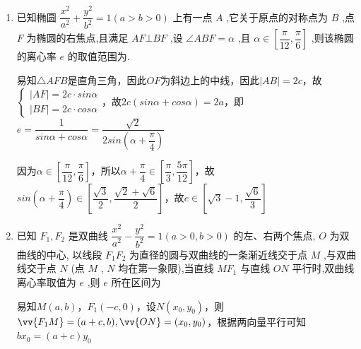 \begin{enumerate}
\begin{jieda}
        由于$y = -t^2+2at-2c^2$开口向下，对称轴为$t = a$，因此应有$\left\{\begin{array}{l}
             a(2a-a)-2c^2 \geq 0 \\
             (a+c)(2a-(a+c)) - 2c^2 \leq 0
        \end{array}\right.$，解得$e = \dfrac{c}{a} \in \left[\dfrac{\sqrt{3}}{3}, \dfrac{\sqrt{2}}{2}\right]$
    \end{jieda}
    \item 已知椭圆 $\dfrac{{x}^{2}}{{a}^{2}} + \dfrac{{y}^{2}}{{b}^{2}} = 1\left( {a > b > 0}\right)$ 上有一点 $A$ ,它关于原点的对称点为 $B$ ,点 $F$ 为椭圆的右焦点,且满足 ${AF} \bot  {BF}$ ,设 $\angle {ABF} = \alpha$ ,且 $\alpha  \in  \left\lbrack  {\dfrac{\pi }{12},\dfrac{\pi }{6}}\right\rbrack$ ,则该椭圆的离心率 $e$ 的取值范围为.
    \begin{jieda}
        易知$\triangle AFB$是直角三角，因此$OF$为斜边上的中线，因此$|AB| = 2c$，故$\left\{\begin{array}{l}
             |AF| = 2c \cdot  sin\alpha  \\
             |BF| = 2c \cdot  cos\alpha 
        \end{array} \right.$，故$2c(sin\alpha + cos\alpha) = 2a$，即$e = \dfrac{1}{sin\alpha + cos\alpha} = \dfrac{\sqrt{2}}{2sin\left(\alpha+\dfrac{\pi}{4}\right)}$
        
        因为$\alpha \in \left\lbrack  {\dfrac{\pi }{12},\dfrac{\pi }{6}}\right\rbrack$，所以$\alpha + \dfrac{\pi}{4} \in \left\lbrack  {\dfrac{\pi }{3},\dfrac{5\pi }{12}}\right\rbrack$，故$sin\left(\alpha+\dfrac{\pi}{4}\right) \in \left[\dfrac{\sqrt{3}}{2}, \dfrac{
        \sqrt{2}+\sqrt{6}}{2}\right]$，故$e \in \left[\sqrt{3}-1, \dfrac{\sqrt{6}}{3}\right]$
    \end{jieda}
    \item 已知 ${F}_{1},{F}_{2}$ 是双曲线 $\dfrac{{x}^{2}}{{a}^{2}} - \dfrac{{y}^{2}}{{b}^{2}} = 1\left( {a > 0,b > 0}\right)$ 的左、右两个焦点, $O$ 为双曲线的中心, 以线段 ${F}_{1}{F}_{2}$ 为直径的圆与双曲线的一条渐近线交于点 $M$ ,与双曲线交于点 $N$ (点 $M$ , $N$ 均在第一象限),当直线 $M{F}_{1}$ 与直线 ${ON}$ 平行时,双曲线离心率取值为 $e$ ,则 $e$ 所在区间为
    \begin{jieda}
        易知$M(a, b)$，$F_1(-c, 0)$，设$N(x_0, y_0)$，则$\vv{F_1M} = (a+c, b), \vv{ON} = (x_0, y_0)$，根据两向量平行可知$bx_0 = (a+c)y_0$


\end{jieda}
\end{enumerate}

